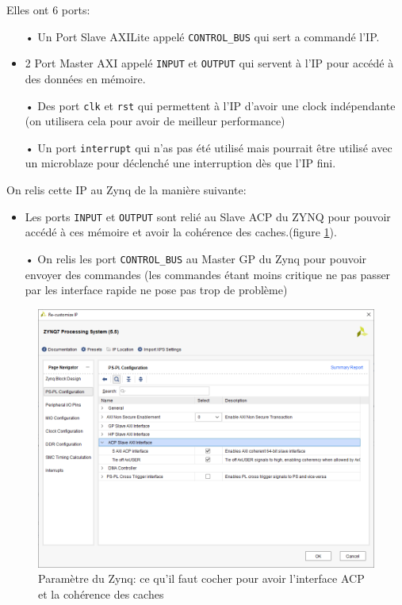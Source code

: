 \documentclass[12pt,a4paper]{ieee}
\begin{document}
Elles ont 6 ports: \begin{itemize}
\item[•]Un Port Slave AXILite appelé \lstinline[language=bash]{CONTROL_BUS} qui sert a commandé l'IP.
\item[•]2 Port Master AXI appelé \lstinline[language=bash]{INPUT} et \lstinline[language=bash]{OUTPUT} qui servent à l'IP pour accédé à des données en mémoire.
\item[•] Des port \lstinline[language=bash]{clk} et \lstinline[language=bash]{rst} qui permettent à l'IP d'avoir une clock indépendante (on utilisera cela pour avoir de meilleur performance)
\item[•]Un port \lstinline[language=bash]{interrupt} qui n'as pas été utilisé mais pourrait être utilisé avec un microblaze pour déclenché une interruption dès que l'IP fini.

\end{itemize}

On relis cette IP au Zynq de la manière suivante:\begin{itemize}
\item[•]Les ports \lstinline[language=bash]{INPUT} et \lstinline[language=bash]{OUTPUT} sont relié au Slave ACP du ZYNQ pour pouvoir accédé à ces mémoire et avoir la cohérence des caches.(figure \ref{fig-acp}).
\item[•] On relis les port \lstinline[language=bash]{CONTROL_BUS} au Master GP du Zynq pour pouvoir envoyer des commandes (les commandes étant moins critique ne pas passer par les interface rapide ne pose pas trop de problème)
\end{itemize}


\begin{figure}[H]
	\centering
		\includegraphics[width=\linewidth]{im/ip2.png}	
	\caption{Paramètre du Zynq: ce qu'il faut cocher pour avoir l'interface ACP et la cohérence des caches}
	\label{fig-acp}
\end{figure}
\end{document}
